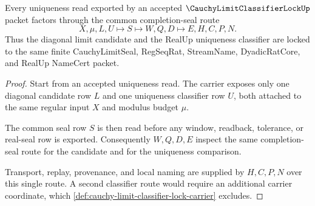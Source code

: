 \begin{theorem}
\label{thm:cauchy-limit-classifier-lock-uniqueness-route}
Every uniqueness read exported by an accepted $\CauchyLimitClassifierLockUp$ packet factors through the common completion-seal route
$$
X,\mu,L,U \longmapsto S \longmapsto W,Q,D \longmapsto E,H,C,P,N .
$$
Thus the diagonal limit candidate and the RealUp uniqueness classifier are locked to the same finite CauchyLimitSeal, RegSeqRat, StreamName, DyadicRatCore, and RealUp NameCert packet.
\end{theorem}
\begin{proof}
Start from an accepted uniqueness read. The carrier exposes only one diagonal candidate row $L$ and one uniqueness classifier row $U$, both attached to the same regular input $X$ and modulus budget $\mu$.

The common seal row $S$ is then read before any window, readback, tolerance, or real-seal row is exported. Consequently $W,Q,D,E$ inspect the same completion-seal route for the candidate and for the uniqueness comparison.

Transport, replay, provenance, and local naming are supplied by $H,C,P,N$ over this single route. A second classifier route would require an additional carrier coordinate, which \autoref{def:cauchy-limit-classifier-lock-carrier} excludes.
\end{proof}




